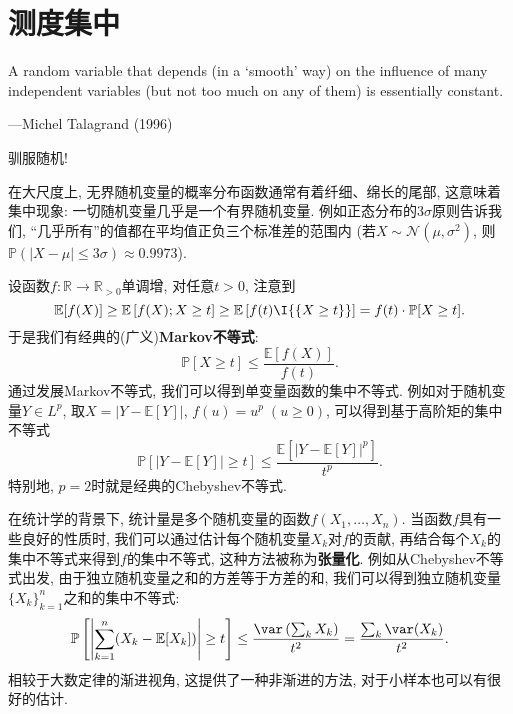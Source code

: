 \section{测度集中}

\epigraph{A random variable that depends (in a ‘smooth’ way) on the influence of many independent variables (but not too much on any of them) is essentially constant.}{---Michel Talagrand (1996)} 

驯服随机!

在大尺度上, 无界随机变量的概率分布函数通常有着纤细、绵长的尾部, 这意味着集中现象: 一切随机变量几乎是一个有界随机变量.  
例如正态分布的$3 \sigma$原则告诉我们, “几乎所有”的值都在平均值正负三个标准差的范围内 (若$X \sim \mathcal{N}(\mu, \sigma^2)$, 则$\mathbb{P}(|X - \mu| \leq 3 \sigma) \approx 0.9973$). 

设函数$f \colon \mathbb{R} \to \mathbb{R}_{>0}$单调增, 对任意$t > 0$, 注意到
\begin{equation*}
	\mathbb{E}[f(X)] 
		\geq \mathbb{E}\left[f(X); X \geq t \right]
		\geq \mathbb{E}\left[f(t) \I{\{X \geq t\}} \right] 
		= f(t) \cdot \mathbb{P}[X \geq t].
\end{equation*}
于是我们有经典的(广义)\textbf{Markov不等式}: 
\begin{equation}\label{eq:Markov'sInequality}
	\mathbb{P}[X \geq t] \leq \frac{\mathbb{E}[f(X)]}{f(t)}.
\end{equation}
通过发展Markov不等式, 我们可以得到单变量函数的集中不等式.
例如对于随机变量$Y \in L^p$, 取$X = |Y - \mathbb{E}[Y]|$, $f(u) = u^p\; (u \geq 0)$, 可以得到基于高阶矩的集中不等式
\begin{equation*}
	\mathbb{P}[|Y - \mathbb{E}[Y]| \geq t] \leq \frac{ \mathbb{E}[ |Y - \mathbb{E}[Y]|^p]}{t^p}. 
\end{equation*} 
特别地, $p=2$时就是经典的Chebyshev不等式. 

 

在统计学的背景下, 统计量是多个随机变量的函数$f(X_1, \dots, X_n)$. 
当函数$f$具有一些良好的性质时, 我们可以通过估计每个随机变量$X_k$对$f$的贡献, 再结合每个$X_k$的集中不等式来得到$f$的集中不等式, 这种方法被称为\textbf{张量化}. 
例如从Chebyshev不等式出发, 由于独立随机变量之和的方差等于方差的和, 我们可以得到独立随机变量$\{X_k\}_{k=1}^n$之和的集中不等式:  
\begin{equation*}
	\mathbb{P} \left[ \left|\sum_{k=1}^n (X_k - \mathbb{E}[X_k]) \right| \geq t \right]
	\leq \frac{\var\left(\sum_k  X_k\right)}{t^2}
	= \frac{\sum_k \var(X_k)}{t^2}. 
\end{equation*}
相较于大数定律的渐进视角, 这提供了一种非渐进的方法, 对于小样本也可以有很好的估计. 

